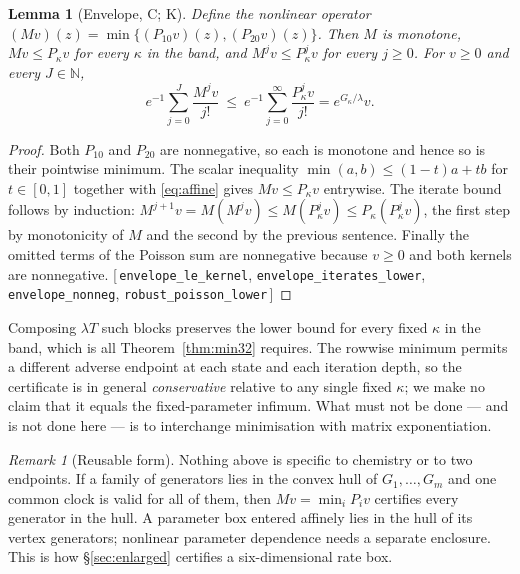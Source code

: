\documentclass[11pt]{article}
\theoremstyle{plain}
\newtheorem{lemma}[theorem]{Lemma}
\theoremstyle{definition}
\theoremstyle{remark}
\newtheorem{remark}[theorem]{Remark}
\newcommand{\N}{\mathbb{N}}
\newcommand{\leanref}[1]{{\normalfont\sffamily\footnotesize[\,#1\,]}}
\begin{document}
\begin{lemma}[Envelope, C; K]\label{lem:envelope}
Define the nonlinear operator $(Mv)(z)=\min\{(P_{10}v)(z),(P_{20}v)(z)\}$.
Then $M$ is monotone, $Mv\le P_\kappa v$ for every $\kappa$ in the band, and
$M^{j}v\le P_\kappa^{j}v$ for every $j\ge0$. For $v\ge0$ and every
$J\in\N$,
\begin{equation}\label{eq:poisson}
e^{-1}\sum_{j=0}^{J}\frac{M^{j}v}{j!}\ \le\
e^{-1}\sum_{j=0}^{\infty}\frac{P_\kappa^{j}v}{j!}=e^{G_\kappa/\lambda}v .
\end{equation}
\end{lemma}

\begin{proof}
Both $P_{10}$ and $P_{20}$ are nonnegative, so each is monotone and hence so
is their pointwise minimum. The scalar inequality
$\min(a,b)\le(1-t)a+tb$ for $t\in[0,1]$ together with \eqref{eq:affine} gives
$Mv\le P_\kappa v$ entrywise. The iterate bound follows by induction:
$M^{j+1}v=M(M^{j}v)\le M(P_\kappa^{j}v)\le P_\kappa(P_\kappa^{j}v)$, the first
step by monotonicity of $M$ and the second by the previous sentence. Finally
the omitted terms of the Poisson sum are nonnegative because $v\ge0$ and both
kernels are nonnegative. \leanref{\texttt{envelope\_le\_kernel},
\texttt{envelope\_iterates\_lower}, \texttt{envelope\_nonneg},
\texttt{robust\_poisson\_lower}}
\end{proof}

Composing $\lambda T$ such blocks preserves the lower bound for every fixed
$\kappa$ in the band, which is all Theorem~\ref{thm:min32} requires. The
rowwise minimum permits a different adverse endpoint at each state and each
iteration depth, so the certificate is in general \emph{conservative} relative
to any single fixed $\kappa$; we make no claim that it equals the
fixed-parameter infimum. What must not be done --- and is not done here --- is
to interchange minimisation with matrix exponentiation.

\begin{remark}[Reusable form]
Nothing above is specific to chemistry or to two endpoints. If a family of
generators lies in the convex hull of $G_1,\dots,G_m$ and one common clock is
valid for all of them, then $Mv=\min_i P_iv$ certifies every generator in the
hull. A parameter box entered affinely lies in the hull of its vertex
generators; nonlinear parameter dependence needs a separate enclosure. This is
how \S\ref{sec:enlarged} certifies a six-dimensional rate box.
\end{remark}
\end{document}
